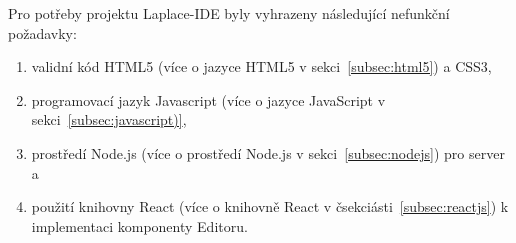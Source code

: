 Pro potřeby projektu Laplace-IDE byly vyhrazeny následující nefunkční požadavky:
\begin{enumerate}
    \item validní kód HTML5 (více o jazyce HTML5 v sekci~\ref{subsec:html5}) a \gls{CSS3},
    \item programovací jazyk Javascript (více o jazyce JavaScript v sekci~\ref{subsec:javascript)},
    \item prostředí Node.js (více o prostředí Node.js v sekci~\ref{subsec:nodejs}) pro server a
    \item použití knihovny React (více o knihovně React v čsekciásti~\ref{subsec:reactjs}) k implementaci komponenty Editoru.
\end{enumerate}
